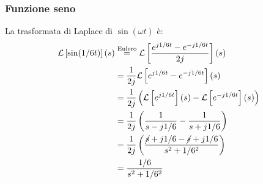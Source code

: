 \documentclass[a4paper]{article}
\begin{document}
\subsubsection{Funzione seno}
\begin{figure}[H]
  \centering
\end{figure}

La trasformata di Laplace di \( \sin(\omega t) \) è:
\[
\begin{aligned}
  \mathcal{L}\left[ \sin(\omega t) \right](s) &\stackrel{\text{Eulero}}{=} \mathcal{L}\left[ \frac{e^{j \omega t} - e^{-j \omega t}}{2j} \right](s)\\
                                              &= \frac{1}{2j} \mathcal{L}\left[ e^{j \omega t} - e^{-j \omega t} \right](s)\\
                                              &= \frac{1}{2j} \left( \mathcal{L}\left[ e^{j \omega t} \right](s) - \mathcal{L}\left[ e^{-j \omega t} \right](s) \right)\\
                                              &= \frac{1}{2j} \left( \frac{1}{s-j \omega} - \frac{1}{s+j \omega} \right)\\
                                              &= \frac{1}{2j} \left( \frac{\cancel{s}+j \omega - \cancel{s}+j \omega}{s^{2} + \omega^{2}} \right)\\
                                              &= \frac{\omega}{s^{2} + \omega^{2}}
\end{aligned}
\]
\end{document}
